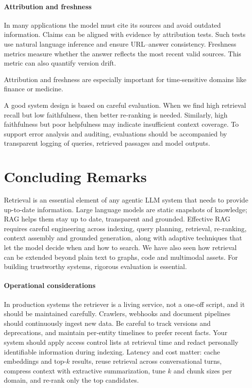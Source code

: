 \paragraph{Attribution and freshness}  In many applications the model must cite its sources and avoid outdated information.  Claims can be aligned with evidence by attribution tests. Such tests use natural language inference and ensure URL–answer consistency.  Freshness metrics measure whether the answer reflects the most recent valid sources. This metric can also  quantify version drift.  

Attribution and freshness are especially important for time‑sensitive domains like finance or medicine.

A good system design is based on careful evaluation. When we find high retrieval recall but low faithfulness, then better re‑ranking is needed. Similarly, high faithfulness but poor helpfulness may indicate insufficient context coverage.  To support error analysis and auditing, evaluations should be accompanied by transparent logging of queries, retrieved passages and model outputs.







\section{Concluding Remarks}

Retrieval is an essential element of any agentic LLM system that needs to provide up-to-date information.   Large language models are static snapshots of knowledge; RAG helps them stay up to date, transparent and grounded.  Effective RAG requires careful engineering across indexing, query planning, retrieval, re‑ranking, context assembly and grounded generation, along with adaptive techniques that let the model decide when and how to search.  We have also seen how retrieval can be extended beyond plain text to graphs, code and multimodal assets. For building trustworthy systems, rigorous evaluation is essential.

\paragraph{Operational considerations}  In production systems the retriever is a living service, not a one‑off script, and it should be maintained carefully.  Crawlers, webhooks and document pipelines should continuously ingest new data. Be careful to track versions and deprecations, and maintain per‑entity timelines to prefer recent facts.  Your system should apply access control lists at retrieval time and redact personally identifiable information during indexing.  Latency and cost matter: cache embeddings and top-$k$ results, reuse retrieval across conversational turns, compress context with extractive summarization, tune $k$ and chunk sizes per domain, and re‑rank only the top candidates.

